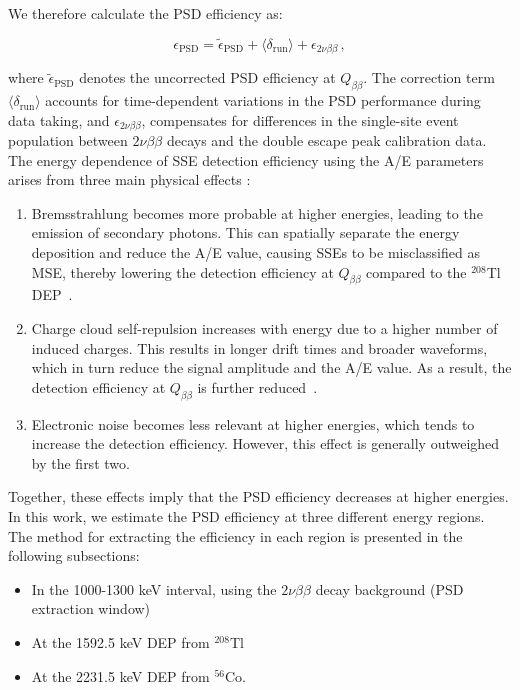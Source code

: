 We therefore calculate the PSD efficiency as:

\begin{equation}
\label{eq:psd_eff_qbb}
    \epsilon_{\mathrm{PSD}} = \tilde{\epsilon}_{\mathrm{PSD}} + \langle \delta_{\mathrm{run}} \rangle + \epsilon_{2 \nu \beta \beta} \,,
\end{equation}

\noindent where $\tilde{\epsilon}_{\mathrm{PSD}}$ denotes the uncorrected PSD efficiency at $Q_{\beta \beta}$. The correction term $\langle \delta_{\mathrm{run}} \rangle$ accounts for time-dependent variations in the PSD performance during data taking, and $\epsilon_{2 \nu \beta \beta}$, compensates for differences in the single-site event population between $2 \nu \beta \beta$ decays and the double escape peak calibration data. 
The energy dependence of SSE detection efficiency using the A/E parameters arises from three main physical effects \cite{comellato_topologies_2023}: 

\begin{enumerate}
    \item Bremsstrahlung becomes more probable at higher energies, leading to the emission of secondary photons. This can spatially separate the energy deposition and reduce the A/E value, causing SSEs to be misclassified as MSE, thereby lowering the detection efficiency at $Q_{\beta \beta}$ compared to the $^{208}$Tl DEP~\cite{comellato_charge_2021}.
    \item Charge cloud self-repulsion increases with energy due to a higher number of induced charges. This results in longer drift times and broader waveforms, which in turn reduce the signal amplitude and the A/E value. As a result, the detection efficiency at $Q_{\beta \beta}$ is further reduced~\cite{Radford_2012}. 
    \item Electronic noise becomes less relevant at higher energies, which tends to increase the detection efficiency. However, this effect is generally outweighed by the first two.
\end{enumerate}

Together, these effects imply that the PSD efficiency decreases at higher energies. In this work, we estimate the PSD efficiency at three different energy regions. The method for extracting the efficiency in each region is presented in the following subsections:

\begin{itemize}
	\item In the 1000-1300 keV interval, using the $2 \nu \beta \beta$ decay background (PSD extraction window)
	\item At the 1592.5 keV DEP from $^{208}$Tl
	\item At the 2231.5 keV DEP from $^{56}$Co.
\end{itemize}


